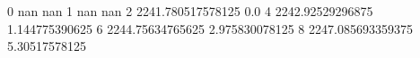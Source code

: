 0 nan nan
1 nan nan
2 2241.780517578125 0.0
4 2242.92529296875 1.144775390625
6 2244.75634765625 2.975830078125
8 2247.085693359375 5.30517578125
